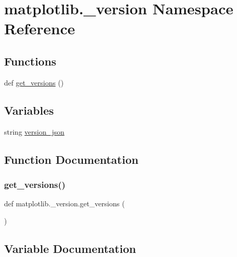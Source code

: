 \hypertarget{namespacematplotlib_1_1__version}{}\section{matplotlib.\+\_\+version Namespace Reference}
\label{namespacematplotlib_1_1__version}
\subsection*{Functions}
\begin{DoxyCompactItemize}
\item 
def \hyperlink{namespacematplotlib_1_1__version_a56502da1583a3c3886f241c219dfa470}{get\+\_\+versions} ()
\end{DoxyCompactItemize}
\subsection*{Variables}
\begin{DoxyCompactItemize}
\item 
string \hyperlink{namespacematplotlib_1_1__version_a23d3095bec84cc2c8bfd0bc2caf84bf4}{version\+\_\+json}
\end{DoxyCompactItemize}


\subsection{Function Documentation}
\mbox{\label{namespacematplotlib_1_1__version_a56502da1583a3c3886f241c219dfa470}} 
\subsubsection{\texorpdfstring{get\+\_\+versions()}{get\_versions()}}
{\footnotesize\ttfamily def matplotlib.\+\_\+version.\+get\+\_\+versions (\begin{DoxyParamCaption}{ }\end{DoxyParamCaption})}



\subsection{Variable Documentation}
\mbox{\label{namespacematplotlib_1_1__version_a23d3095bec84cc2c8bfd0bc2caf84bf4}} 
